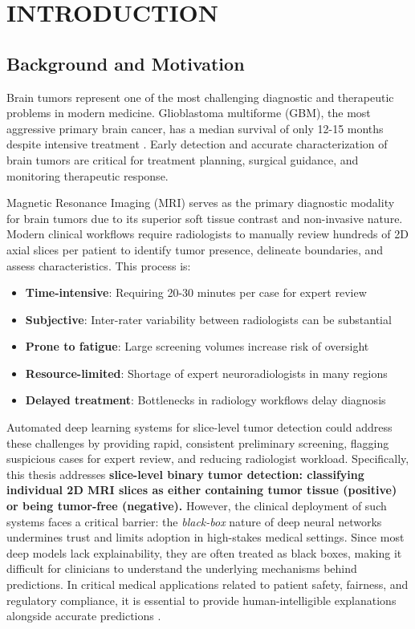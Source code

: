\chapter{INTRODUCTION}
\label{ch:introduction}

\section{Background and Motivation}

Brain tumors represent one of the most challenging diagnostic and therapeutic problems in modern medicine. Glioblastoma multiforme (GBM), the most aggressive primary brain cancer, has a median survival of only 12-15 months despite intensive treatment \cite{stupp2005radiotherapy}. Early detection and accurate characterization of brain tumors are critical for treatment planning, surgical guidance, and monitoring therapeutic response.

Magnetic Resonance Imaging (MRI) serves as the primary diagnostic modality for brain tumors due to its superior soft tissue contrast and non-invasive nature. Modern clinical workflows require radiologists to manually review hundreds of 2D axial slices per patient to identify tumor presence, delineate boundaries, and assess characteristics. This process is:

\begin{itemize}
    \item \textbf{Time-intensive}: Requiring 20-30 minutes per case for expert review
    \item \textbf{Subjective}: Inter-rater variability between radiologists can be substantial
    \item \textbf{Prone to fatigue}: Large screening volumes increase risk of oversight
    \item \textbf{Resource-limited}: Shortage of expert neuroradiologists in many regions
    \item \textbf{Delayed treatment}: Bottlenecks in radiology workflows delay diagnosis
\end{itemize}

Automated deep learning systems for slice-level tumor detection could address these challenges by providing rapid, consistent preliminary screening, flagging suspicious cases for expert review, and reducing radiologist workload. Specifically, this thesis addresses \textbf{slice-level binary tumor detection: classifying individual 2D MRI slices as either containing tumor tissue (positive) or being tumor-free (negative).} However, the clinical deployment of such systems faces a critical barrier: the \textit{black-box} nature of deep neural networks undermines trust and limits adoption in high-stakes medical settings. Since most deep models lack explainability, they are often treated as black boxes, making it difficult for clinicians to understand the underlying mechanisms behind predictions. In critical medical applications related to patient safety, fairness, and regulatory compliance, it is essential to provide human-intelligible explanations alongside accurate predictions \cite{selvaraju2017grad}.

